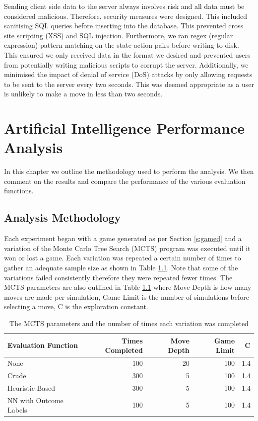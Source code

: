 \documentclass{bhamthesis}
\theoremstyle{definition}
\begin{document}
Sending client side data to the server always involves risk and all data must be considered malicious. Therefore, security measures were designed. This included sanitising SQL queries before inserting into the database. This prevented cross site scripting (XSS) and SQL injection. Furthermore, we ran regex (regular expression) pattern matching on the state-action pairs before writing to disk. This ensured we only received data in the format we desired and prevented users from potentially writing malicious scripts to corrupt the server. Additionally, we minimised the impact of denial of service (DoS) attacks by only allowing requests to be sent to the server every two seconds. This was deemed appropriate as a user is unlikely to make a move in less than two seconds.

\chapter{Artificial Intelligence Performance Analysis}\label{ch:aiAnalysis}
In this chapter we outline the methodology used to perform the analysis. We then comment on the results and compare the performance of the various evaluation functions.

\section{Analysis Methodology}\label{s:analMeth}
Each experiment began with a game generated as per Section \ref{s:gamed} and a variation of the Monte Carlo Tree Search (MCTS) program was executed until it won or lost a game. Each variation was repeated a certain number of times to gather an adequate sample size as shown in Table \ref{t:MCTSConfig}. Note that some of the variations failed consistently therefore they were repeated fewer times. The MCTS parameters are also outlined in Table \ref{t:MCTSConfig} where Move Depth is how many moves are made per simulation, Game Limit is the number of simulations before selecting a move, C is the exploration constant. 

\begin{table}[]
	\centering
	\caption{The MCTS parameters and the number of times each variation was completed}
	\label{t:MCTSConfig}
	\begin{tabular}{lrrrr}
		\hline
		Evaluation Function    & Times Completed & Move Depth & Game Limit & C   \\ \hline
		None                   & 100             & 20         & 100        & 1.4 \\
		Crude                  & 300             & 5          & 100        & 1.4 \\
		Heuristic Based        & 300             & 5          & 100        & 1.4 \\
		NN with Outcome Labels & 100             & 5          & 100        & 1.4
	\end{tabular}
	\end{table}
\end{document}
